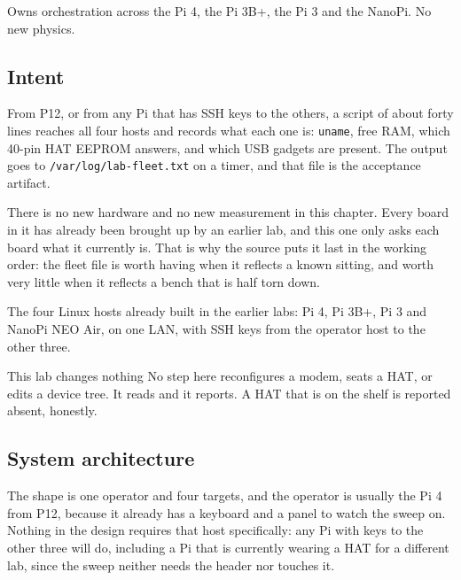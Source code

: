 
\begin{unique}
Owns orchestration across the Pi 4, the Pi 3B+, the Pi 3 and the NanoPi. No new physics.
\end{unique}

\subsection*{Intent}

From P12, or from any Pi that has SSH keys to the others, a script of about forty lines reaches all four hosts and records what each one is: \texttt{uname}, free RAM, which 40-pin HAT EEPROM answers, and which USB gadgets are present. The output goes to \texttt{/var/log/lab-fleet.txt} on a timer, and that file is the acceptance artifact.

There is no new hardware and no new measurement in this chapter. Every board in it has already been brought up by an earlier lab, and this one only asks each board what it currently is. That is why the source puts it last in the working order: the fleet file is worth having when it reflects a known sitting, and worth very little when it reflects a bench that is half torn down.

\begin{kit}
The four Linux hosts already built in the earlier labs: Pi 4, Pi 3B+, Pi 3 and NanoPi NEO Air, on one LAN, with SSH keys from the operator host to the other three.
\end{kit}

\begin{rulebox}{This lab changes nothing}
No step here reconfigures a modem, seats a HAT, or edits a device tree. It reads and it reports. A HAT that is on the shelf is reported absent, honestly.
\end{rulebox}

\subsection*{System architecture}


The shape is one operator and four targets, and the operator is usually the Pi 4 from P12, because it already has a keyboard and a panel to watch the sweep on. Nothing in the design requires that host specifically: any Pi with keys to the other three will do, including a Pi that is currently wearing a HAT for a different lab, since the sweep neither needs the header nor touches it.

